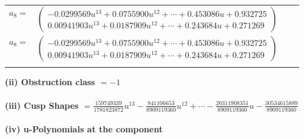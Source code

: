 \documentclass[1p]{elsarticle_modified}
\theoremstyle{definition}
\begin{document}
\begin{tabular}{m{7pt} m{180pt} m{7pt} m{180pt} }
\flushright $a_{8}=$&$\begin{pmatrix}-0.0299569 u^{13}+0.0755900 u^{12}+\cdots+0.453086 u+0.932725\\0.00941903 u^{13}+0.0187909 u^{12}+\cdots+0.243684 u+0.271269\end{pmatrix}$\\ \flushright $a_{8}=$&$\begin{pmatrix}-0.0299569 u^{13}+0.0755900 u^{12}+\cdots+0.453086 u+0.932725\\0.00941903 u^{13}+0.0187909 u^{12}+\cdots+0.243684 u+0.271269\end{pmatrix}$\\&\end{tabular}
\flushleft \textbf{(ii) Obstruction class $= -1$}\\~\\
\flushleft \textbf{(iii) Cusp Shapes $= \frac{159749339}{1781823872} u^{13}-\frac{841106653}{8909119360} u^{12}+\cdots-\frac{20311908351}{8909119360} u-\frac{30534615889}{8909119360}$}\\~\\
\newpage\renewcommand{\arraystretch}{1}
\flushleft \textbf{(iv) u-Polynomials at the component}\newline \\
\end{document}
